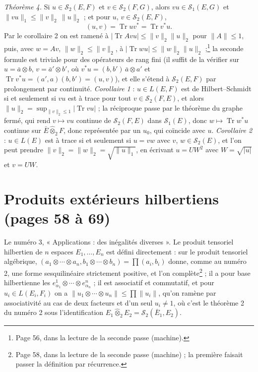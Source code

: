 \documentclass[11pt,a4paper]{article}
\begin{document}
\emph{Théorème 4.} Si $u \in \mathcal{S}_2(E,F)$ et $v \in \mathcal{S}_2(F,G)$,
alors $vu \in \mathcal{S}_1(E,G)$ et $\|vu\|_1 \leq \|v\|_2\,\|u\|_2$ ; et pour
$u$, $v \in \mathcal{S}_2(E,F)$,
\[
  (u, v) = \operatorname{Tr} uv^{*} = \operatorname{Tr} v^{*}u .
\]
Par le corollaire 2 on est ramené à $|\operatorname{Tr} Avu| \leq
\|v\|_2\|u\|_2$ pour $\|A\| \leq 1$, puis, avec $w = Av$, $\|w\|_2 \leq
\|v\|_2$, à $|\operatorname{Tr} wu| \leq \|w\|_2\|u\|_2$ ;\footnote{Page 56,
dans la lecture de la seconde passe (machine).} la seconde formule est
triviale pour des opérateurs de rang fini (il suffit de la vérifier sur
$u = \bar{a} \otimes b$, $v = \bar{a}' \otimes b'$, où $v^{*}u = (b, b')\,\bar{a}
\otimes a'$ et $\operatorname{Tr} v^{*}u = (a', a)(b, b') = (u, v)$),
et elle s'étend à $\mathcal{S}_2(E,F)$ par prolongement par continuité.
\emph{Corollaire 1} : $u \in L(E,F)$ est de Hilbert--Schmidt si et seulement
si $vu$ est à trace pour tout $v \in \mathcal{S}_2(F,E)$, et alors $\|u\|_2 =
\sup_{\|v\|_2 \leq 1} |\operatorname{Tr} vu|$ ; la réciproque passe par le
théorème du graphe fermé, qui rend $v \mapsto vu$ continue de
$\mathcal{S}_2(F,E)$ dans $\mathcal{S}_1(E)$, donc $w \mapsto
\operatorname{Tr} w^{*}u$ continue sur $\bar{E} \mathbin{\hat\otimes}_2 F$,
donc représentée par un $u_0$, qui coïncide avec $u$.
\emph{Corollaire 2} : $u \in L(E)$ est à trace si et seulement si $u = vw$
avec $v$, $w \in \mathcal{S}_2(E)$, et l'on peut prendre $\|v\|_2 = \|w\|_2 =
\sqrt{\|u\|_1}$, en écrivant $u = U W^2$ avec $W = \sqrt{|u|}$ et $v = UW$.

\section*{Produits extérieurs hilbertiens (pages 58 à 69)}

Le numéro 3, « Applications : des inégalités diverses ». Le produit tensoriel
hilbertien de $n$ espaces $E_1, \ldots, E_n$ est défini directement : sur le
produit tensoriel algébrique, $(a_1 \otimes \cdots \otimes a_n, b_1 \otimes
\cdots \otimes b_n) = \prod (a_i, b_i)$ donne, comme au numéro 2, une forme
sesquilinéaire strictement positive, et l'on complète\footnote{Page 58, dans
la lecture de la seconde passe (machine) ; la première faisait passer la
définition par récurrence.} ; il a pour base hilbertienne les $e^1_{\alpha_1} \otimes \cdots \otimes
e^n_{\alpha_n}$ ; il est associatif et commutatif, et pour $u_i \in L(E_i, F_i)$ on a
$\|u_1 \otimes \cdots \otimes u_n\| \leq \prod \|u_i\|$, qu'on ramène par
associativité au cas de deux facteurs et d'un seul $u_i \neq 1$, où c'est le
théorème 2 du numéro 2 sous l'identification $E_1 \mathbin{\hat\otimes}_2 E_2
= \mathcal{S}_2(\bar{E}_1, E_2)$.
\end{document}
